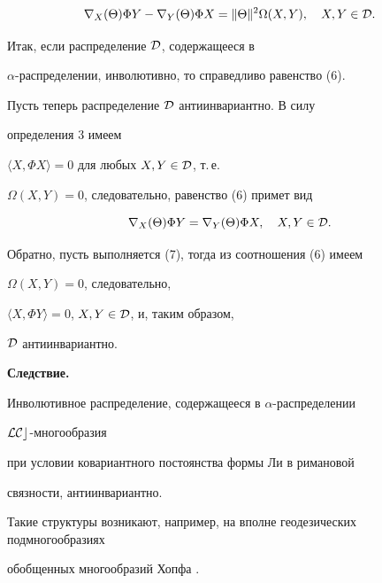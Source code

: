 \begin{pf}
\begin{equation}
\nabla_X (\Theta)\Phi Y-\nabla_Y (\Theta)\Phi X=


\|\Theta\|^2 \Omega (X,Y),\quad X,Y\in\cal D.


\end{equation}





Итак, если распределение $\cal D$, содержащееся в


$\alpha$-распределении, инволютивно, то справедливо равенство (6).





Пусть теперь распределение $\cal D$ антиинвариантно. В силу 


определения 3 имеем


$\langle X,\Phi X \rangle=0$ для любых $X, Y\in\cal D$, т.\,е.\


$\Omega (X,Y)=0$, следовательно, равенство (6) примет вид


\begin{equation}


\nabla_X (\Theta)\Phi Y=\nabla_Y (\Theta)\Phi X, 


\quad X, Y\in\cal D.


\end{equation}


Обратно, пусть выполняется (7), тогда из соотношения (6) имеем


$\Omega (X,Y)=0$, следовательно,


$\langle X,\Phi Y \rangle=0$, $X, Y\in\cal D$, и, таким образом,


$\cal D$ антиинвариантно.


\end{pf}





{\bf Следствие.}


Инволютивное распределение, содержащееся в $\alpha$-распределении


$\cal LCc$-много\-об\-ра\-зия


при условии ковариантного постоянства формы Ли в римановой 


связности, антиинвариантно.


\medskip





Такие структуры возникают, например, на вполне геодезических подмногообразиях 


обобщенных многообразий Хопфа \cite{7}.





